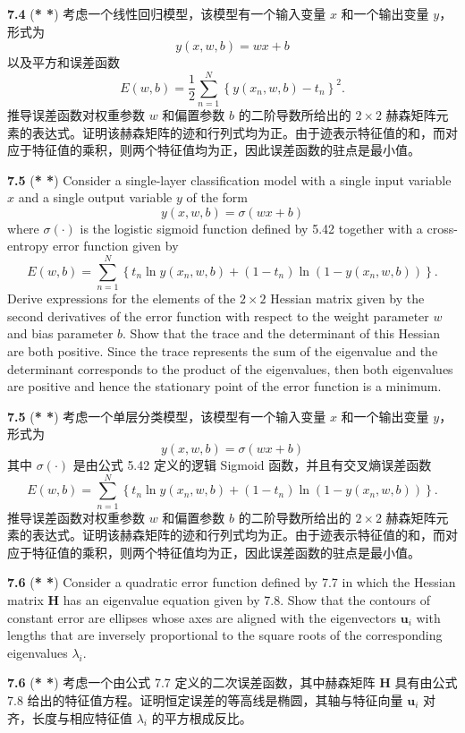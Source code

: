 \documentclass{article}
\begin{document}
\textbf{7.4} (\textbf{* *}) 考虑一个线性回归模型，该模型有一个输入变量 $x$ 和一个输出变量 $y$，形式为
\[
y(x, w, b) = wx + b
\]
以及平方和误差函数
\[
E(w, b) = \frac{1}{2} \sum_{n=1}^{N} \left\{ y(x_n, w, b) - t_n \right\}^2.
\]
推导误差函数对权重参数 $w$ 和偏置参数 $b$ 的二阶导数所给出的 $2 \times 2$ 赫森矩阵元素的表达式。证明该赫森矩阵的迹和行列式均为正。由于迹表示特征值的和，而对应于特征值的乘积，则两个特征值均为正，因此误差函数的驻点是最小值。

\textbf{7.5} (\textbf{* *}) Consider a single-layer classification model with a single input variable $x$ and a single output variable $y$ of the form
\[
y(x, w, b) = \sigma(wx + b)
\]
where $\sigma(\cdot)$ is the logistic sigmoid function defined by {5.42} together with a cross-entropy error function given by
\[
E(w, b) = \sum_{n=1}^{N} \left\{ t_n \ln y(x_n, w, b) + (1 - t_n) \ln(1 - y(x_n, w, b)) \right\}.
\]
Derive expressions for the elements of the $2 \times 2$ Hessian matrix given by the second derivatives of the error function with respect to the weight parameter $w$ and bias parameter $b$. Show that the trace and the determinant of this Hessian are both positive. Since the trace represents the sum of the eigenvalue and the determinant corresponds to the product of the eigenvalues, then both eigenvalues are positive and hence the stationary point of the error function is a minimum.

\textbf{7.5} (\textbf{* *}) 考虑一个单层分类模型，该模型有一个输入变量 $x$ 和一个输出变量 $y$，形式为
\[
y(x, w, b) = \sigma(wx + b)
\]
其中 $\sigma(\cdot)$ 是由公式 {5.42} 定义的逻辑 Sigmoid 函数，并且有交叉熵误差函数
\[
E(w, b) = \sum_{n=1}^{N} \left\{ t_n \ln y(x_n, w, b) + (1 - t_n) \ln(1 - y(x_n, w, b)) \right\}.
\]
推导误差函数对权重参数 $w$ 和偏置参数 $b$ 的二阶导数所给出的 $2 \times 2$ 赫森矩阵元素的表达式。证明该赫森矩阵的迹和行列式均为正。由于迹表示特征值的和，而对应于特征值的乘积，则两个特征值均为正，因此误差函数的驻点是最小值。

\textbf{7.6} (\textbf{* *}) Consider a quadratic error function defined by {7.7} in which the Hessian matrix $\mathbf{H}$ has an eigenvalue equation given by {7.8}. Show that the contours of constant error are ellipses whose axes are aligned with the eigenvectors $\mathbf{u}_i$ with lengths that are inversely proportional to the square roots of the corresponding eigenvalues $\lambda_i$.

\textbf{7.6} (\textbf{* *}) 考虑一个由公式 {7.7} 定义的二次误差函数，其中赫森矩阵 $\mathbf{H}$ 具有由公式 {7.8} 给出的特征值方程。证明恒定误差的等高线是椭圆，其轴与特征向量 $\mathbf{u}_i$ 对齐，长度与相应特征值 $\lambda_i$ 的平方根成反比。
\end{document}
